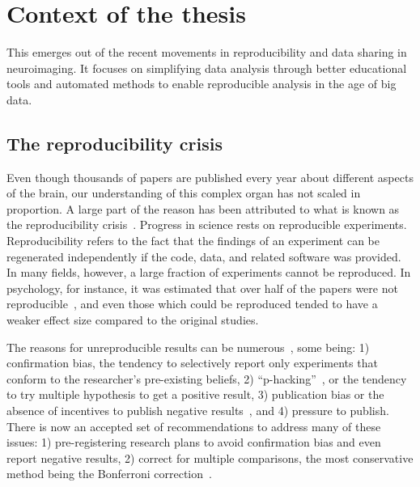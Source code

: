 \section*{Context of the thesis}
This emerges out of the recent movements in reproducibility and data sharing in neuroimaging. It focuses on simplifying data analysis through better educational tools and automated methods to enable reproducible analysis in the age of big data.

\subsection*{The reproducibility crisis}
\label{sec:sommaire:reproducibility_crisis}
Even though thousands of papers are published every year about different aspects of the brain, our understanding of this complex organ has not scaled in proportion. A large part of the reason has been attributed to what is known as the reproducibility crisis~\citep{ioannidis2005most, simmons2011false, button2013power}. %
Progress in science rests on reproducible experiments. Reproducibility refers to the fact that the findings of an experiment can be regenerated independently if the code, data, and related software was provided. In many fields, however, a large fraction of experiments cannot be reproduced. In psychology, for instance, it was estimated that over half of the papers were not reproducible~\citep{open2015estimating}, and even those which could be reproduced tended to have a weaker effect size compared to the original studies. 

The reasons for unreproducible results can be numerous~\citep{baker20161}, some being: 1) confirmation bias, the tendency to selectively report only experiments that conform to the researcher's pre-existing beliefs, 2) ``p-hacking''~\citep{simmons2011false}, or the tendency to try multiple hypothesis to get a positive result, 3) publication bias or the absence of incentives to publish negative results~\citep{rosenthal1979file}, and 4) pressure to publish. There is now an accepted set of recommendations to address many of these issues: 1) pre-registering research plans to avoid confirmation bias and even report negative results, 2) correct for multiple comparisons, the most conservative method being the Bonferroni correction~\citep{dunn1961multiple}. 

